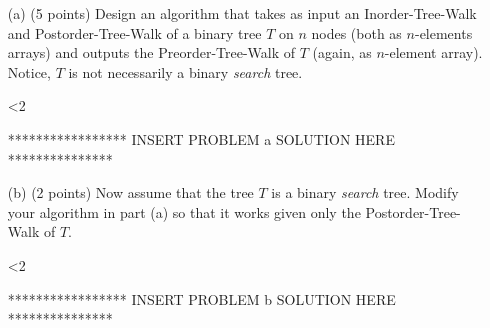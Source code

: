 
\begin{itemize}

\item[(a)] (5 points) Design an algorithm that takes as input an {\sc
    Inorder-Tree-Walk} and {\sc Postorder-Tree-Walk} of a binary tree
  $T$ on $n$ nodes (both as $n$-elements arrays) and outputs the {\sc
    Preorder-Tree-Walk} of $T$ (again, as $n$-element array). Notice,
  $T$ is not necessarily a binary {\em search} tree.

\ifnum\me<2
\begin{solution}
***************** INSERT PROBLEM \prob a SOLUTION HERE ***************
\end{solution}
\fi

\item[(b)] (2 points) Now assume that the tree $T$ is a binary {\em
    search} tree. Modify your algorithm in part (a) so that it works
  given only the {\sc Postorder-Tree-Walk} of $T$.

\ifnum\me<2
\begin{solution}
***************** INSERT PROBLEM \prob b SOLUTION HERE ***************
\end{solution}
\fi

\end{itemize}
